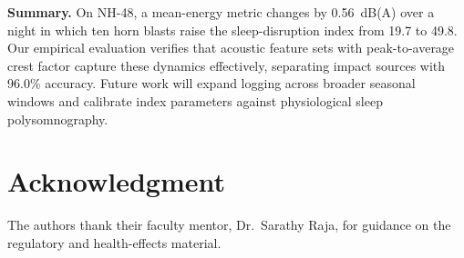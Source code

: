 \documentclass[conference]{IEEEtran}
\begin{document}
\textbf{Summary.} On NH-48, a mean-energy metric changes by 0.56~dB(A) over a night in which ten horn blasts raise the sleep-disruption index from 19.7 to 49.8. Our empirical evaluation verifies that acoustic feature sets with peak-to-average crest factor capture these dynamics effectively, separating impact sources with 96.0\% accuracy. Future work will expand logging across broader seasonal windows and calibrate index parameters against physiological sleep polysomnography.

\section*{Acknowledgment}
The authors thank their faculty mentor, Dr.\ Sarathy Raja, for guidance on the regulatory and health-effects material.
\end{document}
